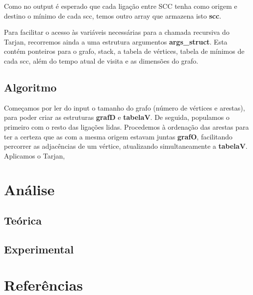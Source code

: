 \documentclass[12pt,a4paper]{article}
\begin{document}
Como no output é esperado que cada ligação entre SCC tenha como origem e destino o mínimo de cada scc, temos outro array que armazena isto \textbf{scc}.

Para facilitar o acesso às variáveis necessárias para a chamada recursiva do Tarjan, recorremos ainda a uma estrutura argumentos \textbf{args\_struct}. Esta contém ponteiros para o grafo, stack, a tabela de vértices, tabela de mínimos de cada scc, além do tempo atual de visita e as dimensões do grafo.
\subsection{Algoritmo}
Começamos por ler do input o tamanho do grafo (número de vértices e arestas), para poder criar as estruturas \textbf{grafD} e \textbf{tabelaV}. De seguida, populamos o primeiro com o resto das ligações lidas.
Procedemos à ordenação das arestas para ter a certeza que as com a mesma origem estavam juntas \textbf{grafO}, facilitando percorrer as adjacências de um vértice, atualizando simultaneamente a \textbf{tabelaV}.
Aplicamos o Tarjan,

\section{Análise}
\subsection{Teórica}
\subsection{Experimental}
\section{Referências}
\end{document}
